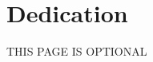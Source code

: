 \documentclass[./dissertation.tex]{subfiles}
\begin{document}
  \chapter*{Dedication}

  \lipsum[7]

  THIS PAGE IS OPTIONAL
\end{document}
